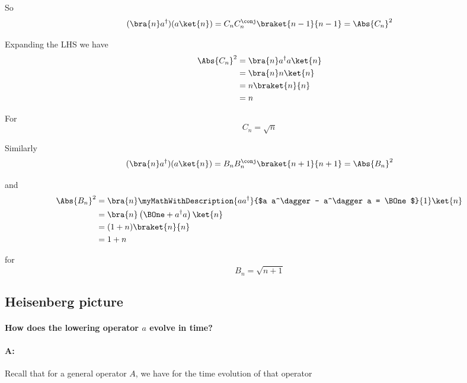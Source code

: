 So
\begin{equation}\label{eqn:PHY356FLecture11:230}
(\bra{n} a^\dagger) (a \ket{n}) = C_n C_n^\conj \braket{n-1}{n-1} = \Abs{C_n}^2
\end{equation}

Expanding the LHS we have
\begin{align*}
\Abs{C_n}^2 &=
\bra{n} a^\dagger a \ket{n} \\
&=
\bra{n} n \ket{n} \\
&=
n \braket{n}{n} \\
&=
n
\end{align*}

For
\begin{equation}\label{eqn:PHY356FLecture11:240}
C_n = \sqrt{n}
\end{equation}

Similarly
\begin{equation}\label{eqn:PHY356FLecture11:250}
(\bra{n} a^\dagger) (a \ket{n}) = B_n B_n^\conj \braket{n+1}{n+1} = \Abs{B_n}^2
\end{equation}

and
\begin{align*}
\Abs{B_n}^2 &=
\bra{n} \myMathWithDescription{a a^\dagger}{$a a^\dagger - a^\dagger a = \BOne$}{1} \ket{n} \\
&=
\bra{n} \left( \BOne + a^\dagger a \right) \ket{n} \\
&=
(1 + n) \braket{n}{n} \\
&=
1 + n
\end{align*}

for
\begin{equation}\label{eqn:PHY356FLecture11:260}
B_n = \sqrt{n + 1}
\end{equation}

\subsection{Heisenberg picture}

\paragraph{How does the lowering operator $a$ evolve in time?}

\paragraph{A:} Recall that for a general operator $A$, we have for the time evolution of that operator

